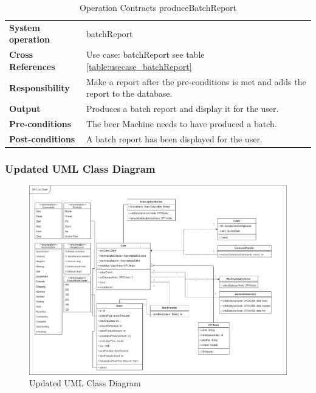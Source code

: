 \begin{table}[H]
    \begin{tabularx}{\textwidth}{|>{\RaggedRight}p{3.7cm}|>{\RaggedRight}X|}
        \hline
        \multicolumn{2}{|c|}{\textbf{batchReport}}\\
        \hline
        \textbf{System operation} & batchReport\\
        \hline
        \textbf{Cross References} & Use case: batchReport see table \ref{table:usecase_batchReport} \\
        \hline
        \textbf{Responsibility} &  Make a report after the pre-conditions is met
                and adds the report to the database.\\
        \hline
        \textbf{Output} & Produces a batch report and display it for the user.\\
        \hline
        \textbf{Pre-conditions} & The beer Machine needs to have produced a batch.\\
        \hline
        \textbf{Post-conditions} & A batch report has been displayed for the
                user. \\
        \hline
    \end{tabularx}
    \caption{Operation Contracts produceBatchReport} 
    \label{table:Operation_Contracts_produceBatchReport}
\end{table}

\subsubsection{Updated UML Class Diagram}
\begin{figure}[ht]
\centering 
\includegraphics[scale=0.3]{images/diagrams/updated_UML_Class_Diagram.drawio.png}
\caption{Updated UML Class Diagram}
\label{figure:updated_UML_class_diagram} 
\end{figure}


